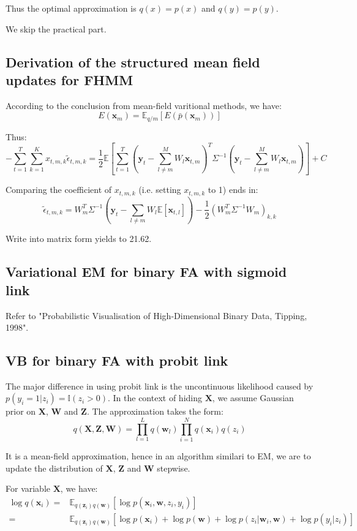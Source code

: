 \documentclass[UTF8]{ctexart}
\begin{document}
Thus the optimal approximation is $q(x)=p(x)$ and $q(y)=p(y)$.

We skip the practical part.

\subsection{Derivation of the structured mean field updates for FHMM}
According to the conclusion from mean-field varitional methods, we have:
$$E(\textbf{x}_{m})=\mathbb{E}_{q/m}[E(\bar{p}(\textbf{x}_{m}))]$$

Thus:
$$-\sum_{t=1}^{T}\sum_{k=1}^{K}x_{t,m,k}\tilde{\epsilon}_{t,m,k}=\frac{1}{2}\mathbb{E}[\sum_{t=1}^{T}(\textbf{y}_{t}-\sum_{l\neq m}^{M}W_{l}\textbf{x}_{t,m})^{T}\Sigma^{-1}(\textbf{y}_{t}-\sum_{l\neq m}^{M}W_{l}\textbf{x}_{t,m})]+C$$

Comparing the coefficient of $x_{t,m,k}$ (i.e. setting $x_{t,m,k}$ to 1) ends in:
$$\tilde{\epsilon}_{t,m,k}=W^{T}_{m}\Sigma^{-1}(\textbf{y}_{t}-\sum_{l\neq m}W_{l}\mathbb{E}[\textbf{x}_{t,l}])-\frac{1}{2}(W^{T}_{m}\Sigma^{-1}W_{m})_{k,k}$$

Write into matrix form yields to 21.62.

\subsection{Variational EM for binary FA with sigmoid link}
Refer to "Probabilistic Visualisation of High-Dimensional Binary Data, Tipping, 1998".

\subsection{VB for binary FA with probit link}
The major difference in using probit link is the uncontinuous likelihood caused by $p(y_{i}=1|z_{i})=\mathbb{I}(z_{i}>0)$. In the context of hiding $\textbf{X}$, we assume Gaussian prior on $\textbf{X}$, $\textbf{W}$ and $\textbf{Z}$. The approximation takes the form:
$$q(\textbf{X},\textbf{Z},\textbf{W})=\prod_{l=1}^{L}q(\textbf{w}_{l})\prod_{i=1}^{N}q(\textbf{x}_{i})q(z_{i})$$

It is a mean-field approximation, hence in an algorithm similari to EM, we are to update the distribution of $\textbf{X}$, $\textbf{Z}$ and $\textbf{W}$ stepwise.

For variable $\textbf{X}$, we have:
\begin{align}
\log q(\textbf{x}_{i})=&\mathbb{E}_{q(\textbf{z}_{i})q(\textbf{w})}[\log p(\textbf{x}_{i},\textbf{w},z_{i},y_{i})] \nonumber \\
=& \mathbb{E}_{q(\textbf{z}_{i})q(\textbf{w})}[\log p(\textbf{x}_{i})+\log p(\textbf{w})+\log p(z_{i}|\textbf{w}_{i},\textbf{w})+\log p(y_{i}|z_{i})] \nonumber
\end{align}
\end{document}

